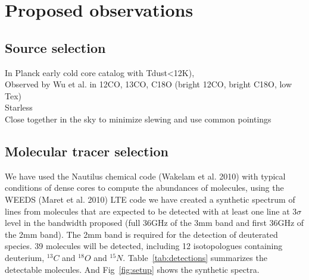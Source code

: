 \section{Proposed observations}
\subsection{Source selection}
  In Planck early cold core catalog with Tdust<12K),\\
  Observed by Wu et al. in 12CO, 13CO, C18O (bright 12CO, bright C18O, low Tex)\\
  Starless\\
  Close together in the sky to minimize slewing and use common pointings
\subsection{Molecular tracer selection}
  We have used the Nautilus chemical code (Wakelam et al. 2010) with typical conditions of dense cores to compute the abundances of molecules, using the WEEDS (Maret et al. 2010) LTE code we have created a synthetic spectrum of lines from molecules that are expected to be detected with at least one line at 3$\sigma$ level in the bandwidth proposed (full 36GHz of the 3mm band and first 36GHz of the 2mm band). The 2mm band is required for the detection of deuterated species. 39 molecules will be detected, including 12 isotopologues containing deuterium, $^{13}C$ and $^{18}O$ and $^{15}N$. Table~\ref{tab:detections} summarizes the detectable molecules. And Fig~\ref{fig:setup} shows the synthetic spectra.
  

  
  
  
  
  
  
  
  
  